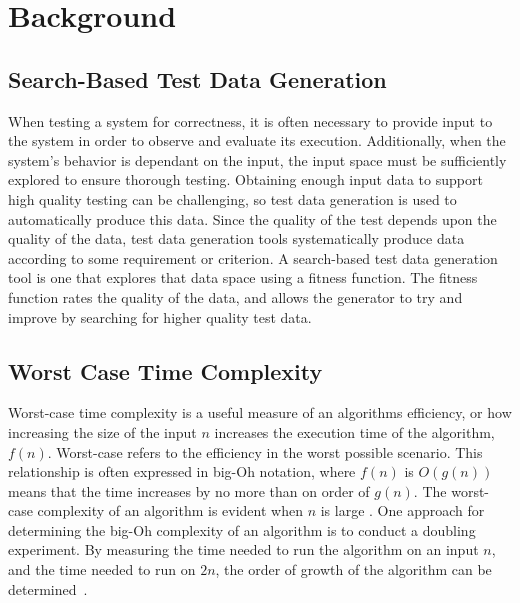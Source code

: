 
\section{Background}


\subsection{Search-Based Test Data Generation}

When testing a system for correctness, it is often necessary to provide input to the system in order to observe and
evaluate its execution. Additionally, when the system's behavior is dependant on the input, the input space must be
sufficiently explored to ensure thorough testing.  Obtaining enough input data to support high quality testing can be
challenging, so test data generation is used to automatically produce this data. Since the quality of the test depends
upon the quality of the data, test data generation tools systematically produce data according to some requirement or
criterion. A search-based test data generation tool is one that explores that data space using a fitness function.  The
fitness function rates the quality of the data, and allows the generator to try and improve by searching for higher
quality test data.



\subsection{Worst Case Time Complexity}

Worst-case time complexity is a useful measure of an algorithms efficiency, or how increasing the size of the input $n$
increases the execution time of the algorithm, $f(n)$.  Worst-case refers to the efficiency in the worst possible
scenario.  This relationship is often expressed in big-Oh notation, where $f(n)$ is $O(g(n))$ means that the time
increases by no more than on order of $g(n)$. The worst-case complexity of an algorithm is evident when $n$ is large
\cite{Goodrich:Data}. One approach for determining the big-Oh complexity of an algorithm is to conduct a doubling
experiment. By measuring the time needed to run the algorithm on an input $n$, and the time needed to run on $2n$, the
order of growth of the algorithm can be determined~\cite{McGeoch2012,Sedgewick1998}.

